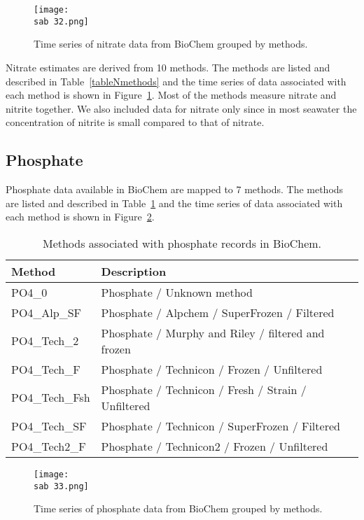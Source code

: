 \documentclass[letterpaper,portrait,11pt]{scrartcl}
\numberwithin{equation}{section}		%
\numberwithin{figure}{section}			%
\numberwithin{table}{section}				%
\newcommand{\ecomod}{\string~/ecomod_data/}   %
\newcommand{\sab}{\ecomod/mpa/sab/}   %
\begin{document}
\begin{appendices}
\begin{figure}[h]
  \centering
  \texttt{[image: \\sab 32.png]}
  \caption{Time series of nitrate data from BioChem grouped by methods.}
  \label{figNTimeseries}
\end{figure}

Nitrate estimates are derived from 10 methods. The methods are listed and described in Table~\ref{tableNmethods} and the time series of data associated with each method is shown in Figure~\ref{figNTimeseries}. Most of the methods measure nitrate and nitrite together. We also included data for nitrate only since  in most seawater the concentration of nitrite is small compared to that of nitrate.


\subsection{Phosphate}

Phosphate  data available in BioChem are mapped to 7 methods. The methods are listed and described in Table~\ref{tablePhosphateMethods} and the time series of data associated with each method is shown in Figure~\ref{figPhosphateTimeseries}.

\begin{table}[h]
  \caption{Methods associated with phosphate records in BioChem.}
  \label{tablePhosphateMethods}
  \begin{tabular}{ll}
    Method & Description \\ \hline
    PO4\_0 & Phosphate / Unknown method  \\ 
    PO4\_Alp\_SF & Phosphate / Alpchem / SuperFrozen / Filtered \\ 
    PO4\_Tech\_2 & Phosphate / Murphy and Riley / filtered and frozen \\ 
    PO4\_Tech\_F & Phosphate / Technicon / Frozen / Unfiltered \\ 
    PO4\_Tech\_Fsh & Phosphate / Technicon / Fresh / Strain / Unfiltered \\
    PO4\_Tech\_SF & Phosphate / Technicon / SuperFrozen / Filtered \\
    PO4\_Tech2\_F & Phosphate / Technicon2 / Frozen / Unfiltered \\
  \end{tabular}
\end{table}


\begin{figure}[h]
  \centering
  \texttt{[image: \\sab 33.png]}
  \caption{Time series of phosphate data from BioChem grouped by methods.}
  \label{figPhosphateTimeseries}
\end{figure}




\end{appendices}
\end{document}
